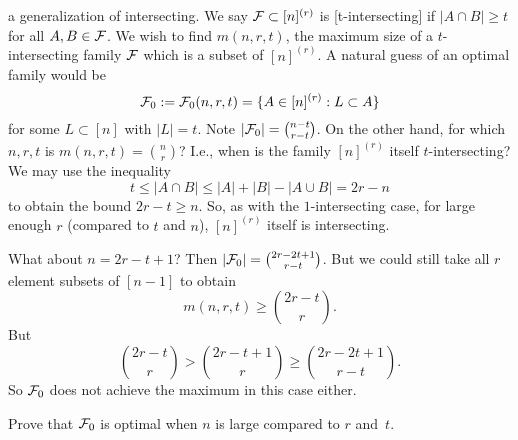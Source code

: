  a generalization of intersecting.
We say $\mathcal{F}\subset [n]^{(r)}$ is [t-intersecting] if $|A\cap B|\geq t$ for all $A,B\in \mathcal{F}$.
We wish to find $m(n,r,t)$, the maximum size of a $t$-intersecting family $\mathcal{F}$ which is a subset of $[n]^{(r)}$.
A natural guess of an optimal family would be 
\[
 \mathcal{F}_0 := \mathcal{F}_0(n,r,t) = \{ A \in [n]^{(r)}: L\subset A\}
\] for some $L\subset [n]$ with $|L| = t$.
Note $|\mathcal{F}_0| = {n-t \choose r-t}$.
On the other hand, for which $n,r,t$ is $m(n,r,t) = {n\choose r}$? I.e., when is the family $[n]^{(r)}$ itself $t$-intersecting?
We may use the inequality
\[
t\leq |A\cap B| \leq |A| + |B| -  |A\cup B| = 2r - n
\]
to obtain the bound $2r-t \geq n$. So, as with the $1$-intersecting case, for large enough $r$ (compared to $t$ and $n$), $[n]^{(r)}$ itself is intersecting.

What about $n=2r-t+1$? Then $|\mathcal{F}_0| = {2r-2t+1 \choose r-t}$. But we could still take all $r$ element subsets of $[n-1]$ to obtain
\[
m(n,r,t) \geq {2r -t \choose r}.
\]
But
\[
{2r -t \choose r} > {2r-t+1 \choose r} \geq {2r -2t+1 \choose r-t}.
\]
So $\mathcal{F}_0$ does not achieve the maximum in this case either.

\begin{exercise}
Prove that $\mathcal{F}_0$ is optimal when $n$ is large compared to $r$ and~$t$.
\end{exercise}



